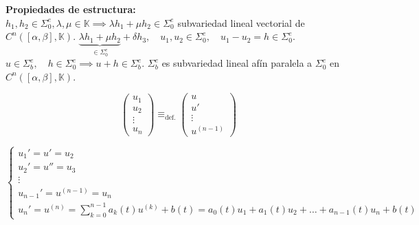 \textbf{Propiedades de estructura:} \\
 $h_1, h_2 \in \Sigma_0^e, \lambda, \mu \in \mathbb{K} \implies \lambda h_1 + \mu h_2 \in \Sigma_0^e$ subvariedad lineal vectorial de $C^n([\alpha, \beta], \mathbb{K})$. $\underbrace{\lambda h_1 + \mu h_2}_{\in \Sigma_0^e} + \delta h_3, \quad u_1, u_2 \in \Sigma_0^e, \quad u_1-u_2 = h \in \Sigma_0^e$. $u \in \Sigma_b^e, \quad h \in \Sigma_0^e \implies u + h \in \Sigma_b^e$. $\Sigma_b^e$ es subvariedad lineal afín paralela a $\Sigma_0^e$ en $C^n([\alpha, \beta], \mathbb{K})$.

 \[
    \begin{pmatrix}
        u_1 \\
        u_2 \\
        \vdots \\
        u_n
    \end{pmatrix} \equiv_{\text{def.}} \begin{pmatrix}
        u \\
        u' \\
        \vdots \\
        u^{(n-1)}
    \end{pmatrix}
\]

\[
    \begin{cases}
        u_1' = u' = u_2 \\
        u_2' = u'' = u_3 \\
        \vdots \\
        u_{n-1}' = u^{(n-1)} = u_n \\
        u_n' = u^{(n)} = \sum_{k=0}^{n-1} a_k(t) u^{(k)} + b(t) = a_0(t) u_1 + a_1(t) u_2 + \ldots + a_{n-1}(t) u_n + b(t)
    \end{cases}
\]

